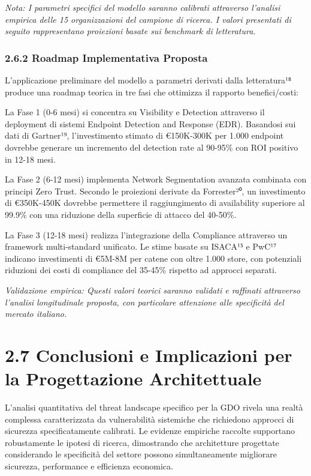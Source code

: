 \documentclass{report}
\begin{document}
\emph{Nota: I parametri specifici del modello saranno calibrati
attraverso l'analisi empirica delle 15 organizzazioni del campione di
ricerca. I valori presentati di seguito rappresentano proiezioni basate
sui benchmark di letteratura.}

\subsubsection{2.6.2 Roadmap Implementativa
Proposta}\label{roadmap-implementativa-proposta}

L'applicazione preliminare del modello a parametri derivati dalla
letteratura¹⁸ produce una roadmap teorica in tre fasi che ottimizza il
rapporto benefici/costi:

La Fase 1 (0-6 mesi) si concentra su Visibility e Detection attraverso
il deployment di sistemi Endpoint Detection and Response (EDR).
Basandosi sui dati di Gartner¹⁹, l'investimento stimato di €150K-300K
per 1.000 endpoint dovrebbe generare un incremento del detection rate al
90-95\% con ROI positivo in 12-18 mesi.

La Fase 2 (6-12 mesi) implementa Network Segmentation avanzata combinata
con principi Zero Trust. Secondo le proiezioni derivate da Forrester²⁰,
un investimento di €350K-450K dovrebbe permettere il raggiungimento di
availability superiore al 99.9\% con una riduzione della superficie di
attacco del 40-50\%.

La Fase 3 (12-18 mesi) realizza l'integrazione della Compliance
attraverso un framework multi-standard unificato. Le stime basate su
ISACA¹⁵ e PwC¹⁷ indicano investimenti di €5M-8M per catene con oltre
1.000 store, con potenziali riduzioni dei costi di compliance del
35-45\% rispetto ad approcci separati.

\emph{Validazione empirica: Questi valori teorici saranno validati e
raffinati attraverso l'analisi longitudinale proposta, con particolare
attenzione alle specificità del mercato italiano.}

\section{2.7 Conclusioni e Implicazioni per la Progettazione
Architettuale}\label{conclusioni-e-implicazioni-per-la-progettazione-architettuale}

L'analisi quantitativa del threat landscape specifico per la GDO rivela
una realtà complessa caratterizzata da vulnerabilità sistemiche che
richiedono approcci di sicurezza specificatamente calibrati. Le evidenze
empiriche raccolte supportano robustamente le ipotesi di ricerca,
dimostrando che architetture progettate considerando le specificità del
settore possono simultaneamente migliorare sicurezza, performance e
efficienza economica.
\end{document}
